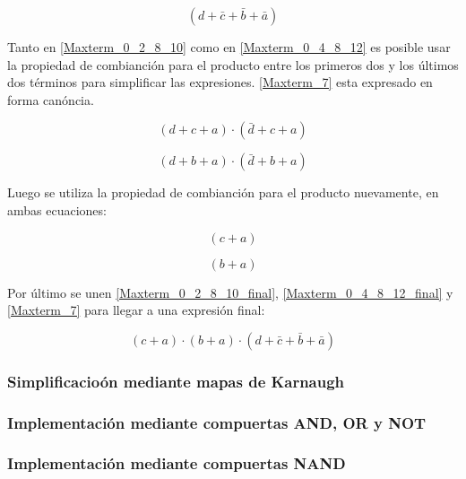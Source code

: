 \begin{equation}\label{Maxterm_7}
(d + \bar{c} + \bar{b} + \bar{a})
\end{equation}

Tanto en \ref{Maxterm_0_2_8_10} como en \ref{Maxterm_0_4_8_12} es posible usar la propiedad de combianción para el producto entre los primeros dos y los últimos dos términos para simplificar las expresiones. \ref{Maxterm_7} esta expresado en forma canóncia.

\begin{equation}\label{Maxterm_0_2_8_10_simp}
(d + c + a) \cdot (\bar{d} + c + a) 
\end{equation}

\begin{equation}\label{Maxterm_0_4_8_12_simp}
(d + b +a) \cdot (\bar{d} + b + a)
\end{equation}

Luego se utiliza la propiedad de combianción para el producto nuevamente, en ambas ecuaciones:

\begin{equation}\label{Maxterm_0_2_8_10_final}
(c + a) 
\end{equation}

\begin{equation}\label{Maxterm_0_4_8_12_final}
(b +a)
\end{equation}

Por último se unen \ref{Maxterm_0_2_8_10_final}, \ref{Maxterm_0_4_8_12_final} y \ref{Maxterm_7} para llegar a una expresión final:

\begin{equation}
\boxed{(c + a) \cdot (b +a) \cdot (d + \bar{c} + \bar{b} + \bar{a})}
\end{equation}

\subsubsection{Simplificacioón mediante mapas de Karnaugh}

\subsubsection{Implementación mediante compuertas AND, OR y NOT}


\subsubsection{Implementación mediante compuertas NAND}
